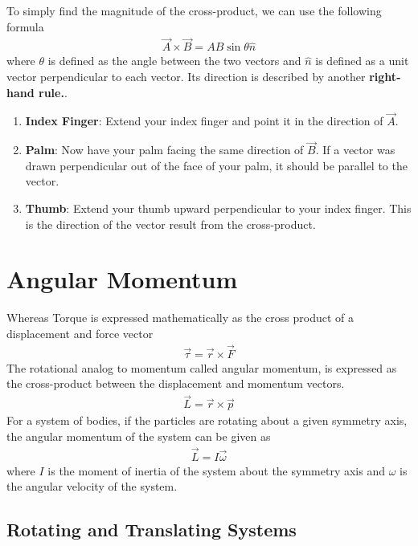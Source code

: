 \documentclass[11pt]{article}
\begin{document}
To simply find the magnitude of the cross-product, we can use the following formula
\begin{align*}
    \Vec{A} \times \Vec{B} = AB\sin\theta \hat{n}
\end{align*}
where $\theta$ is defined as the angle between the two vectors and $\hat{n}$ is defined as a unit vector perpendicular to each vector. Its direction is described by another \textbf{right-hand rule.}.

\begin{enumerate}
    \item \textbf{Index Finger}: Extend your index finger and point it in the direction of $\Vec{A}$. 
    \item \textbf{Palm}: Now have your palm facing the same direction of $\Vec{B}$. If a vector was drawn perpendicular out of the face of your palm, it should be parallel to the vector.
    \item \textbf{Thumb}: Extend your thumb upward perpendicular to your index finger. This is the direction of the vector result from the cross-product.
\end{enumerate}

\section{Angular Momentum}

Whereas Torque is expressed mathematically as the cross product of a displacement and force vector
\begin{align*}
    \Vec{\tau} = \Vec{r} \times \Vec{F}
\end{align*}
The rotational analog to momentum called angular momentum, is expressed as the cross-product between the displacement and momentum vectors.
\begin{align*}
    \Vec{L} = \Vec{r} \times \Vec{p}
\end{align*}
For a system of bodies, if the particles are rotating about a given symmetry axis, the angular momentum of the system can be given as
\begin{align*}
    \Vec{L} = I\Vec{\omega}
\end{align*}
where $I$ is the moment of inertia of the system about the symmetry axis and $\omega$ is the angular velocity of the system.

\subsection{Rotating and Translating Systems}
\end{document}
